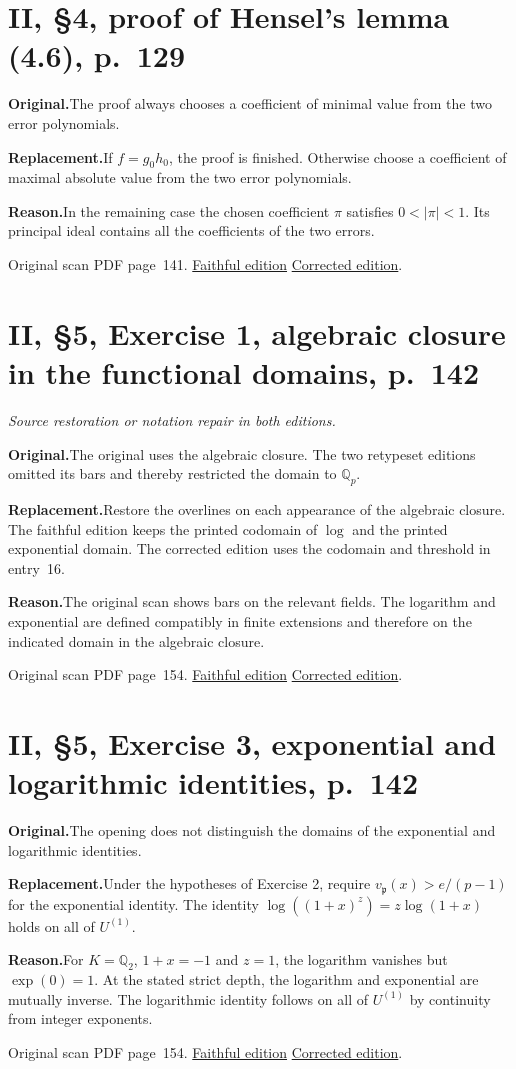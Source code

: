 \documentclass[11pt,a4paper]{article}
\newcommand{\original}{\par\smallskip\noindent\textbf{Original.}\enspace}
\newcommand{\replacement}{\par\smallskip\noindent\textbf{Replacement.}\enspace}
\newcommand{\reason}{\par\smallskip\noindent\textbf{Reason.}\enspace}
\newcommand{\editionlink}[3]{\href{#1\#errata.#2}{#3}}
\newcommand{\location}[2]{%
  \par\smallskip\noindent Original scan PDF page~#2.\enspace
  \editionlink{Neukirch_Faithful.pdf}{#1}{Faithful edition}
  \quad\editionlink{Neukirch_Corrected.pdf}{#1}{Corrected edition}.}
\begin{document}
\setcounter{section}{75}
\section{II, \S4, proof of Hensel\textquoteright{}s lemma (4.6), p.~129}\label{errata:item:76}

\original The proof always chooses a coefficient of minimal value from the two error polynomials.
\replacement If $f=g_0h_0$, the proof is finished. Otherwise choose a coefficient of maximal absolute value from the two error polynomials.
\reason In the remaining case the chosen coefficient $\pi$ satisfies $0<|\pi|<1$. Its principal ideal contains all the coefficients of the two errors.
\location{76}{141}

\setcounter{section}{76}
\section{II, \S5, Exercise 1, algebraic closure in the functional domains, p.~142}\label{errata:item:77}
\noindent\emph{Source restoration or notation repair in both editions.}\par
\original The original uses the algebraic closure. The two retypeset editions omitted its bars and thereby restricted the domain to $\mathbb Q_p$.
\replacement Restore the overlines on each appearance of the algebraic closure. The faithful edition keeps the printed codomain of $\log$ and the printed exponential domain. The corrected edition uses the codomain and threshold in entry~16.
\reason The original scan shows bars on the relevant fields. The logarithm and exponential are defined compatibly in finite extensions and therefore on the indicated domain in the algebraic closure.
\location{77}{154}

\setcounter{section}{77}
\section{II, \S5, Exercise 3, exponential and logarithmic identities, p.~142}\label{errata:item:78}

\original The opening does not distinguish the domains of the exponential and logarithmic identities.
\replacement Under the hypotheses of Exercise 2, require $v_{\mathfrak p}(x)>e/(p-1)$ for the exponential identity. The identity $\log((1+x)^z)=z\log(1+x)$ holds on all of $U^{(1)}$.
\reason For $K=\mathbb Q_2$, $1+x=-1$ and $z=1$, the logarithm vanishes but $\exp(0)=1$. At the stated strict depth, the logarithm and exponential are mutually inverse. The logarithmic identity follows on all of $U^{(1)}$ by continuity from integer exponents.
\location{78}{154}
\end{document}
